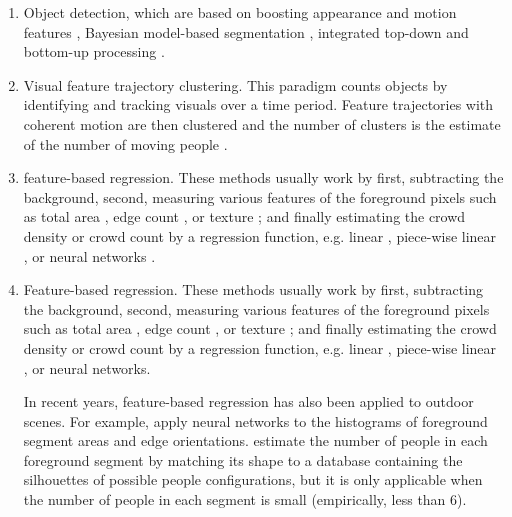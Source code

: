 \begin{enumerate}
	\item Object detection, which are  based on boosting appearance and motion features \cite{viola2005detecting, viola2004robust}, Bayesian model-based segmentation \cite{zhao2003bayesian}, integrated top-down and bottom-up processing \cite{leibe2005pedestrian, oliva2003top,chan2008privacy}.
	\item Visual feature trajectory clustering. This paradigm counts objects by identifying and tracking visuals over a  time period. Feature trajectories with coherent motion are then clustered and the number of clusters is the estimate of the number of moving people \cite{rabaud2006counting, brostow2006unsupervised,chan2008privacy}. 

	\item feature-based regression. These methods usually work by first, subtracting the background, second, measuring various features of the foreground pixels such as total area \cite{paragios2001mrf, davies1995crowd}, edge count \cite{cho1999neural, regazzoni1996distributed}, or texture  \cite{marana1998efficacy}; and finally estimating the crowd density or crowd count by a regression function, e.g. linear \cite{paragios2001mrf, davies1995crowd}, piece-wise linear \cite{regazzoni1996distributed}, or neural networks \cite{cho1999neural, regazzoni1996distributed}. 

	\item Feature-based regression. These methods usually work by first, subtracting the background, second, measuring various features of the foreground pixels such as total area \cite{paragios2001mrf, davies1995crowd}, edge count \cite{cho1999neural, regazzoni1996distributed}, or texture \cite{marana1998efficacy}; and finally estimating the crowd density or crowd count by a regression function, e.g. linear \cite{paragios2001mrf, davies1995crowd}, piece-wise linear \cite{regazzoni1996distributed}, or neural networks\cite{cho1999neural, regazzoni1996distributed}. 


	\indent In recent years, feature-based regression has also been applied to outdoor scenes. For example, \citealt{kong2005counting} apply neural networks to the histograms of foreground segment areas and edge orientations. \citealt{dong2007fast} estimate  the number of people in each foreground segment by matching its shape to a database containing the silhouettes of possible people configurations, but it is  only applicable when the number of people in each segment is small (empirically, less than 6)\cite{chan2008privacy}.  
\end{enumerate} 
